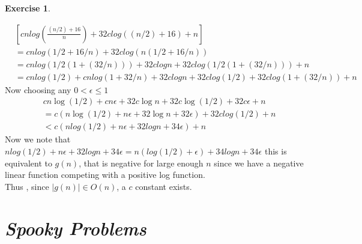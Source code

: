 \documentclass{article}
\theoremstyle{definition}
\newtheorem{exercise}{Exercise}[section]
\begin{document}
\begin{exercise}
\begin{enumerate}[a)]
        \begin{align*}
            & [cnlog(\frac{(n/2)+16}{n})+32clog((n/2)+16)+n] \\
            &= cnlog( 1/2 + 16/n ) + 32clog(n(1/2 +16/n))\\
            &=cnlog(1/2(1+(32/n)))+32clogn+32clog(1/2(1+(32/n)))+n\\
            &=cnlog(1/2)+cnlog(1+32/n)+32clogn+32clog(1/2)+32clog(1+(32/n))+n
        \end{align*}
        Now choosing any $0 < \epsilon \leqslant 1$
        \begin{align*}
            &cn\log (1/2)+cn\epsilon +32c \log n+32 c\log (1/2)+32c \epsilon+n\\
            &= c(n\log (1/2)+n\epsilon + 32\log n+32 \epsilon)+32clog(1/2)+n\\
            &< c(nlog(1/2)+ n\epsilon +32logn+34\epsilon)+n
        \end{align*}
        Now we note that $nlog(1/2)+n\epsilon+32logn+34\epsilon=n(log(1/2)+\epsilon)+34logn+34\epsilon$ this is equivalent to $g(n)$, that is negative
         for large enough $n$ since we have a negative  linear function competing with a positive log function.\\
         Thus , since $|g(n)| \in O(n)$, a $c$ constant exists.
    \end{enumerate}
\end{exercise}

\section{\textit{Spooky Problems}}
\end{document}
